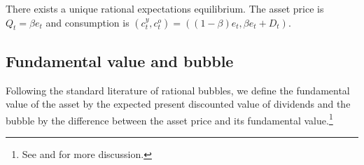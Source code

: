 \documentclass[a4paper,12pt]{article}
\numberwithin{equation}{section}
\theoremstyle{plain}
\begin{document}
\begin{prop}\label{prop:eq_toy}
There exists a unique rational expectations equilibrium. The asset price is $Q_t=\beta e_t$ and consumption is $(c_t^y,c_t^o)=((1-\beta)e_t,\beta e_t+D_t)$.
\end{prop}

\subsection{Fundamental value and bubble}\label{subsec:toy_bubble}

Following the standard literature of rational bubbles, we define the fundamental value of the asset by the expected present discounted value of dividends and the bubble by the difference between the asset price and its fundamental value.\footnote{See \citet{SantosWoodford1997} and \citet{HiranoToda2024JME,HiranoToda2025JPE,HiranoToda2025EJW} for more discussion.} 
\end{document}
